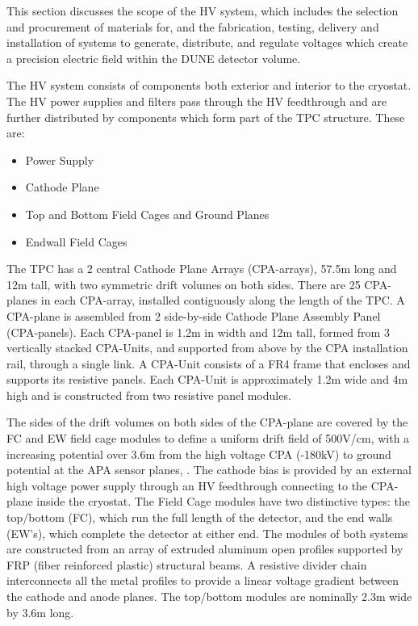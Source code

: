 This section discusses the  scope of the HV system, which includes the selection and procurement of materials for, and the fabrication, testing, delivery and installation of systems to generate, distribute, and regulate voltages which create a precision electric field within the DUNE detector volume. 

The HV system consists of components both exterior and interior to the cryostat. The HV power supplies and filters pass through the HV feedthrough and are further distributed by components which form part of the TPC structure. These are:
\begin{itemize}
\item Power Supply
\item Cathode Plane
\item Top and Bottom Field Cages and Ground Planes
\item Endwall Field Cages 
\end{itemize}
The TPC has a 2 central Cathode Plane Arrays (CPA-arrays), 57.5m long and 12m tall, with two symmetric drift volumes on both sides. There are 25 CPA-planes in each CPA-array, installed contiguously along the length of the TPC. A CPA-plane is assembled from 2 side-by-side Cathode Plane Assembly Panel (CPA-panels). Each CPA-panel is 1.2m in width and 12m tall, formed from 3 vertically stacked CPA-Units, and supported from above by the CPA installation rail, through a single link.
A CPA-Unit consists of a FR4 frame that encloses and supports its resistive panels.  Each CPA-Unit is approximately 1.2m wide and 4m high and is constructed from two resistive panel modules.

The sides of the drift volumes on both sides of the CPA-plane are covered by the FC and EW field cage modules to define a uniform drift field of 500V/cm, with a increasing potential over 3.6m from the high voltage CPA (-180kV) to ground potential at the APA sensor planes, . The cathode bias is provided by an external high voltage power supply through an HV feedthrough connecting to the CPA-plane inside the cryostat.
The Field Cage modules have two distinctive types: the top/bottom (FC), which run the full length of the detector, and the end walls (EW's), which complete the detector at either end. The modules of both systems are constructed from an array of extruded aluminum open profiles supported by FRP (fiber reinforced plastic) structural beams. A resistive divider chain interconnects all the metal profiles to provide a linear voltage gradient between the cathode and anode planes.  The top/bottom modules are nominally 2.3m wide by 3.6m long. 

